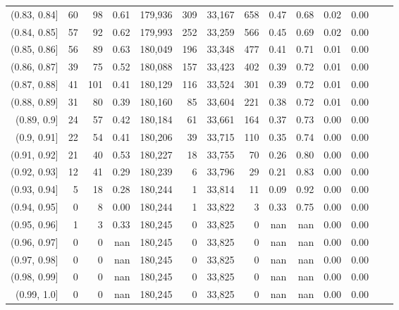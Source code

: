 \begin{tabular}{rrrrrrrrrrrrrr}
(0.83, 0.84]   &     60 &   98 &    0.61 &  179,936 &      309 &  33,167 &     658 &  0.47 &  0.68 &  0.02 &      0.00 \\
(0.84, 0.85]   &     57 &   92 &    0.62 &  179,993 &      252 &  33,259 &     566 &  0.45 &  0.69 &  0.02 &      0.00 \\
(0.85, 0.86]   &     56 &   89 &    0.63 &  180,049 &      196 &  33,348 &     477 &  0.41 &  0.71 &  0.01 &      0.00 \\
(0.86, 0.87]   &     39 &   75 &    0.52 &  180,088 &      157 &  33,423 &     402 &  0.39 &  0.72 &  0.01 &      0.00 \\
(0.87, 0.88]   &     41 &  101 &    0.41 &  180,129 &      116 &  33,524 &     301 &  0.39 &  0.72 &  0.01 &      0.00 \\
(0.88, 0.89]   &     31 &   80 &    0.39 &  180,160 &       85 &  33,604 &     221 &  0.38 &  0.72 &  0.01 &      0.00 \\
(0.89, 0.9]    &     24 &   57 &    0.42 &  180,184 &       61 &  33,661 &     164 &  0.37 &  0.73 &  0.00 &      0.00 \\
(0.9, 0.91]    &     22 &   54 &    0.41 &  180,206 &       39 &  33,715 &     110 &  0.35 &  0.74 &  0.00 &      0.00 \\
(0.91, 0.92]   &     21 &   40 &    0.53 &  180,227 &       18 &  33,755 &      70 &  0.26 &  0.80 &  0.00 &      0.00 \\
(0.92, 0.93]   &     12 &   41 &    0.29 &  180,239 &        6 &  33,796 &      29 &  0.21 &  0.83 &  0.00 &      0.00 \\
(0.93, 0.94]   &      5 &   18 &    0.28 &  180,244 &        1 &  33,814 &      11 &  0.09 &  0.92 &  0.00 &      0.00 \\
(0.94, 0.95]   &      0 &    8 &    0.00 &  180,244 &        1 &  33,822 &       3 &  0.33 &  0.75 &  0.00 &      0.00 \\
(0.95, 0.96]   &      1 &    3 &    0.33 &  180,245 &        0 &  33,825 &       0 &   nan &   nan &  0.00 &      0.00 \\
(0.96, 0.97]   &      0 &    0 &     nan &  180,245 &        0 &  33,825 &       0 &   nan &   nan &  0.00 &      0.00 \\
(0.97, 0.98]   &      0 &    0 &     nan &  180,245 &        0 &  33,825 &       0 &   nan &   nan &  0.00 &      0.00 \\
(0.98, 0.99]   &      0 &    0 &     nan &  180,245 &        0 &  33,825 &       0 &   nan &   nan &  0.00 &      0.00 \\
(0.99, 1.0]    &      0 &    0 &     nan &  180,245 &        0 &  33,825 &       0 &   nan &   nan &  0.00 &      0.00 \\
\bottomrule
\end{tabular}

